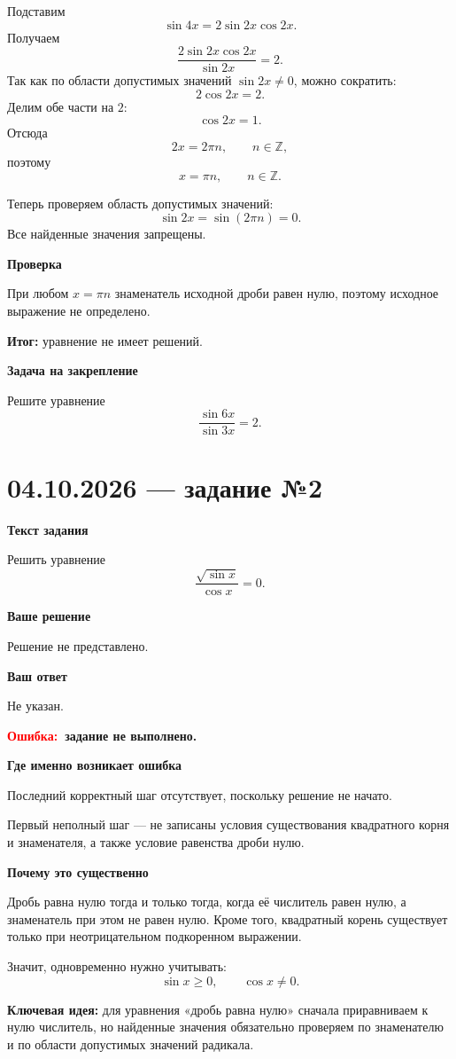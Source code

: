 \documentclass[12pt,a4paper]{article}
\newcommand{\err}{\textcolor{red}{Ошибка:}}
\newcommand{\idea}{\textcolor{blue!60!black}{Ключевая идея:}}
\newcommand{\result}{\textcolor{teal!60!black}{Итог:}}
\begin{document}
Подставим
\[
\sin 4x=2\sin 2x\cos 2x.
\]
Получаем
\[
\frac{2\sin 2x\cos 2x}{\sin 2x}=2.
\]
Так как по области допустимых значений \(\sin 2x\ne 0\), можно сократить:
\[
2\cos 2x=2.
\]
Делим обе части на \(2\):
\[
\cos 2x=1.
\]
Отсюда
\[
2x=2\pi n,\qquad n\in\mathbb Z,
\]
поэтому
\[
x=\pi n,\qquad n\in\mathbb Z.
\]

Теперь проверяем область допустимых значений:
\[
\sin 2x=\sin(2\pi n)=0.
\]
Все найденные значения запрещены.

\textbf{Проверка}

При любом \(x=\pi n\) знаменатель исходной дроби равен нулю, поэтому исходное выражение не определено.

\textbf{\result} уравнение не имеет решений.

\textbf{Задача на закрепление}

Решите уравнение
\[
\frac{\sin 6x}{\sin 3x}=2.
\]

\newpage
{}\label{task:0410-2}
\section*{04.10.2026 — задание №2}

\textbf{Текст задания}

Решить уравнение
\[
\frac{\sqrt{\sin x}}{\cos x}=0.
\]

\textbf{Ваше решение}

Решение не представлено.

\textbf{Ваш ответ}

Не указан.

\textbf{\err\ задание не выполнено.}

\textbf{Где именно возникает ошибка}

Последний корректный шаг отсутствует, поскольку решение не начато.

Первый неполный шаг --- не записаны условия существования квадратного корня и знаменателя, а также условие равенства дроби нулю.

\textbf{Почему это существенно}

Дробь равна нулю тогда и только тогда, когда её числитель равен нулю, а знаменатель при этом не равен нулю. Кроме того, квадратный корень существует только при неотрицательном подкоренном выражении.

Значит, одновременно нужно учитывать:
\[
\sin x\ge 0,\qquad \cos x\ne 0.
\]

\textbf{\idea} для уравнения «дробь равна нулю» сначала приравниваем к нулю числитель, но найденные значения обязательно проверяем по знаменателю и по области допустимых значений радикала.
\end{document}
